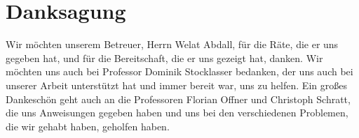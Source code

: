 \chapter*{Danksagung}

Wir möchten unserem Betreuer, Herrn Welat Abdall, für die Räte, die er uns gegeben hat, und für die Bereitschaft, die er uns gezeigt hat, danken. Wir möchten uns auch bei Professor Dominik Stocklasser bedanken, der uns auch bei unserer Arbeit unterstützt hat und immer bereit war, uns zu helfen. Ein großes Dankeschön geht auch an die Professoren Florian Offner und Christoph Schratt, die uns Anweisungen gegeben haben und uns bei den verschiedenen Problemen, die wir gehabt haben, geholfen haben.
